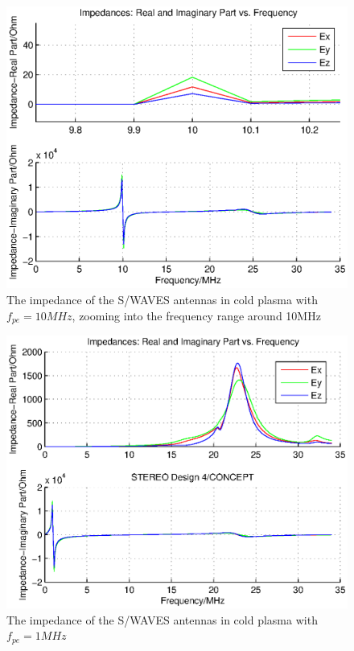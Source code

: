 \documentclass[a4paper,11pt]{thesis}
\begin{document}
\begin{figure}
\begin{center}
\includegraphics[width=11.5cm]{DissPics/impedance_stereo_pl_fix_zoom.eps}
  \caption{The impedance of the S/WAVES antennas in cold plasma with $f_{pe}=10MHz$, zooming into the frequency range around 10MHz}\label{fig:imp_stereo_fix_zoom}
\end{center}
\end{figure}

\begin{figure}
\begin{center}
\includegraphics[width=11.5cm]{DissPics/impedance_stereo_pl_1mhz.eps}
  \caption{The impedance of the S/WAVES antennas in cold plasma with $f_{pe}=1MHz$}\label{fig:imp_stereo_1MHZ}
\end{center}
\end{figure}
\end{document}
